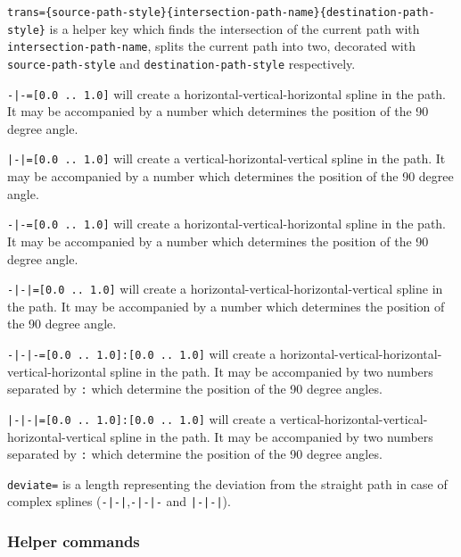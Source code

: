 \begin{optionslist}
\item \texttt{trans=\{source-path-style\}\{intersection-path-name\}\{destination-path-style\}} is a helper key which finds the intersection of the current path with \texttt{intersection-path-name}, splits the current path into two, decorated with \texttt{source-path-style} and  \texttt{destination-path-style} respectively.
\item \texttt{-|-=[0.0 .. 1.0]} will create a horizontal-vertical-horizontal spline in the path. It may be accompanied by a number which determines the position of the 90 degree angle.
\item \texttt{|-|=[0.0 .. 1.0]} will create a vertical-horizontal-vertical spline in the path. It may be accompanied by a number which determines the position of the 90 degree angle.
\item \texttt{-|-=[0.0 .. 1.0]} will create a horizontal-vertical-horizontal spline in the path. It may be accompanied by a number which determines the position of the 90 degree angle.
\item \texttt{-|-|=[0.0 .. 1.0]} will create a horizontal-vertical-horizontal-vertical spline in the path. It may be accompanied by a number which determines the position of the 90 degree angle.
\item \texttt{-|-|-=[0.0 .. 1.0]:[0.0 .. 1.0]} will create a horizontal-vertical-horizontal-vertical-horizontal spline in the path. It may be accompanied by two numbers  separated by \texttt{:} which determine the position of the 90 degree angles.
\item \texttt{|-|-|=[0.0 .. 1.0]:[0.0 .. 1.0]} will create a vertical-horizontal-vertical-horizontal-vertical spline in the path. It may be accompanied by two numbers  separated by \texttt{:} which determine the position of the 90 degree angles.
\item \texttt{deviate=} is a length representing the deviation from the straight path in case of complex splines (\texttt{-|-|},\texttt{-|-|-} and \texttt{|-|-|}).
\end{optionslist}

\subsubsection{Helper commands}
\label{sec:helper-commands}

